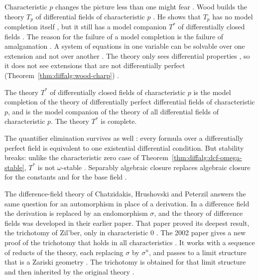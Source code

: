 Characteristic $p$ changes the picture less than one might fear
\cite[pp.~577--584]{Wood1973ModelTheory}. Wood builds the theory $T_p$
of differential fields of characteristic $p$
\cite[pp.~577--584]{Wood1973ModelTheory}. He shows that $T_p$ has no
model completion itself
\cite[p.~579]{Wood1973ModelTheory}, but it still has a model companion
$T^*$ of differentially closed fields \cite[p.~582]{Wood1973ModelTheory}.
The reason for the failure of a model completion is the failure of
amalgamation \cite[Theorem~2, p.~579]{Wood1973ModelTheory}. A system of
equations in one variable can be solvable over one extension and not over
another
\cite[pp.~579--580]{Wood1973ModelTheory}. The theory only sees
differential properties
\cite[pp.~579--580]{Wood1973ModelTheory}, so it does not see extensions
that are not differentially perfect (Theorem~\ref{thm:diffalg:wood-charp})
\cite[pp.~579--580]{Wood1973ModelTheory}.\begin{theorem}\label{thm:diffalg:wood-charp}
The theory $T^*$ of differentially closed fields of characteristic $p$
is the model completion of the theory of differentially perfect
differential fields of characteristic $p$, and is the model companion of
the theory of all differential fields of characteristic $p$. The theory
$T^*$ is complete.
\end{theorem}

The quantifier elimination survives as well
\cite[Theorem~11, p.~583]{Wood1973ModelTheory}: every formula over a
differentially perfect field is equivalent to one existential
differential condition. But stability breaks: unlike the characteristic
zero case of Theorem~\ref{thm:diffalg:dcf-omega-stable}, $T^*$ is not
$\omega$-stable \cite[p.~577]{Wood1973ModelTheory}. Separably algebraic
closure replaces algebraic closure for the constants and for the base
field \cite[Theorem~10, p.~582]{Wood1973ModelTheory}.

The difference-field theory of Chatzidakis, Hrushovski and Peterzil answers the
same question for an automorphism in place of a derivation.
In a difference field the derivation is replaced by an endomorphism $\sigma$,
and the theory of difference fields was developed in their earlier paper.
That paper proved its deepest result, the trichotomy of Zil'ber, only in
characteristic $0$ \cite[p.~257]{ChatzidakisHrushovskiPeterzil2002}.
The 2002 paper gives a new proof of the trichotomy that holds in all
characteristics \cite[p.~257]{ChatzidakisHrushovskiPeterzil2002}.
It works with a sequence of reducts of the theory, each replacing
$\sigma$ by $\sigma^{n}$, and passes to a limit structure that is a Zariski
geometry \cite[p.~257]{ChatzidakisHrushovskiPeterzil2002}.
The trichotomy is obtained for that limit structure and then inherited by the
original theory \cite[p.~257]{ChatzidakisHrushovskiPeterzil2002}.

